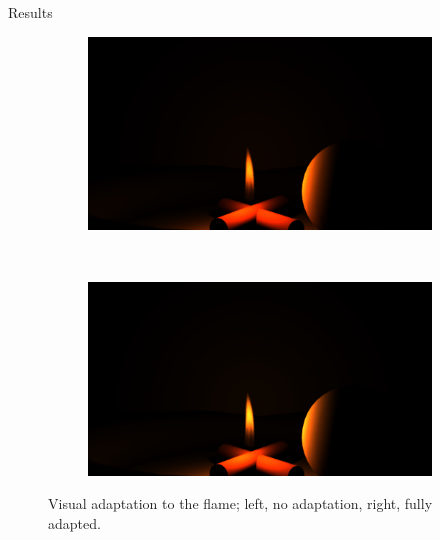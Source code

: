 \documentclass{beamer}
\begin{document}
\begin{frame}[allowframebreaks]{Results}
\begin{figure}[p]
        \centering
        \begin{subfigure}[b]{0.25\textwidth}
                \includegraphics[width=\textwidth, trim={14.5cm 2.5cm 16.5cm 10.5cm}, clip]{img/result_propane_shadows}
        \end{subfigure}%
        ~ 
        \begin{subfigure}[b]{0.25\textwidth}
                \includegraphics[width=\textwidth, trim={14.5cm 2.5cm 16.5cm 10.5cm}, clip]{img/result_propane_1_v}
        \end{subfigure}%
        \caption*{Visual adaptation to the flame; left, no adaptation, right, fully adapted.}
\end{figure}


\end{frame}
\end{document}
